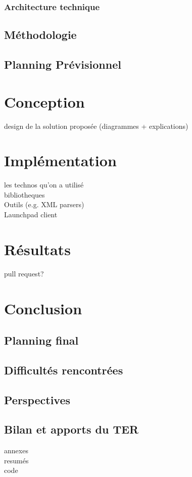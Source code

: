 \documentclass[12pt,a4paper]{report}
\theoremstyle{definition}
\begin{document}
\subsection{Architecture technique}

\section{Méthodologie}

\section{Planning Prévisionnel}

\chapter{Conception}
design de la solution proposée (diagrammes + explications)

\chapter{Implémentation}
les technos qu'on a utilisé\\
bibliotheques\\
Outils (e.g. XML parsers)\\
Launchpad client

\chapter{Résultats}
pull request?

\chapter{Conclusion}
\section{Planning final}

\section{Difficultés rencontrées}

\section{Perspectives}

\section{Bilan et apports du TER}
annexes\\
resumés\\
code



\end{document}
